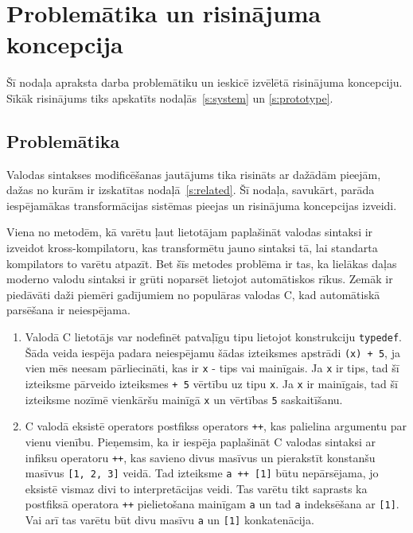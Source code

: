 \section{Problemātika un risinājuma koncepcija}
\label{s:motivation}

Šī nodaļa apraksta darba problemātiku un ieskicē izvēlētā risinājuma koncepciju. Sīkāk risinājums tiks apskatīts nodaļās~\ref{s:system} un \ref{s:prototype}.

\subsection{Problemātika}

Valodas sintakses modificēšanas jautājums tika risināts ar dažādām pieejām, dažas no kurām ir izskatītas nodaļā~\ref{s:related}. Šī nodaļa, savukārt, parāda iespējamākas transformācijas sistēmas pieejas un risinājuma koncepcijas izveidi.

Viena no metodēm, kā varētu ļaut lietotājam paplašināt valodas sintaksi ir izveidot kross\--kom\-pi\-la\-to\-ru, kas transformētu jauno sintaksi tā, lai standarta kompilators to varētu atpazīt. Bet šīs metodes problēma ir tas, ka lielākas daļas moderno valodu sintaksi ir grūti noparsēt lietojot automātiskos rīkus. Zemāk ir piedāvāti daži piemēri gadījumiem no populāras valodas C, kad automātiskā parsēšana ir neiespējama.

\begin{enumerate}
\item
Valodā C lietotājs var nodefinēt patvaļīgu tipu lietojot konstrukciju \verb|typedef|. Šāda veida iespēja padara neiespējamu šādas izteiksmes apstrādi \verb|(x) + 5|, ja vien mēs neesam pārliecināti, kas ir \verb|x| - tips vai mainīgais. Ja \verb|x| ir tips, tad šī izteiksme pārveido izteiksmes \verb|+ 5| vērtību uz tipu \verb|x|. Ja \verb|x| ir mainīgais, tad šī izteiksme nozīmē vienkāršu mainīgā \verb|x| un vērtības \verb|5| saskaitīšanu. 
\item
C valodā eksistē operators postfikss operators \verb|++|, kas palielina argumentu par vienu vienību. Pieņemsim, ka ir iespēja paplašināt C valodas sintaksi ar infiksu operatoru \verb|++|, kas savieno divus masīvus un pierakstīt konstanšu masīvus \verb|[1, 2, 3]| veidā. Tad izteiksme \verb|a ++ [1]| būtu nepārsējama, jo eksistē vismaz divi to interpretācijas veidi. Tas varētu tikt saprasts ka postfiksā operatora \verb|++| pielietošana mainīgam \verb|a| un tad \verb|a| indeksēšana ar \verb|[1]|. Vai arī tas varētu būt divu masīvu \verb|a| un \verb|[1]| konkatenācija.
\end{enumerate}

